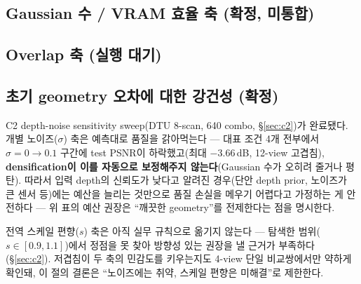 \subsection{Gaussian 수 / VRAM 효율 축 (확정, 미통합)}
\label{sec:guideline-efficiency}


\subsection{Overlap 축 (실행 대기)}
\label{sec:guideline-overlap}


\subsection{초기 geometry 오차에 대한 강건성 (확정)}
\label{sec:guideline-depth-noise}

C2 depth-noise sensitivity sweep(DTU 8-scan, 640 combo, \S\ref{sec:c2})가 완료됐다. 개별 노이즈($\sigma$) 축은 예측대로 품질을 갉아먹는다 — 대표 조건 4개 전부에서 $\sigma=0\to0.1$ 구간에 test PSNR이 하락했고(최대 $-3.66\,$dB, 12-view 고겹침), \textbf{densification이 이를 자동으로 보정해주지 않는다}(Gaussian 수가 오히려 줄거나 평탄). 따라서 입력 depth의 신뢰도가 낮다고 알려진 경우(단안 depth prior, 노이즈가 큰 센서 등)에는 예산을 늘리는 것만으로 품질 손실을 메우기 어렵다고 가정하는 게 안전하다 — 위 표의 예산 권장은 ``깨끗한 geometry''를 전제한다는 점을 명시한다.

전역 스케일 편향($s$) 축은 아직 실무 규칙으로 옮기지 않는다 — 탐색한 범위($s\in[0.9,1.1]$)에서 정점을 못 찾아 방향성 있는 권장을 낼 근거가 부족하다(\S\ref{sec:c2}). 저겹침이 두 축의 민감도를 키우는지도 4-view 단일 비교쌍에서만 약하게 확인돼, 이 절의 결론은 ``노이즈에는 취약, 스케일 편향은 미해결''로 제한한다.

